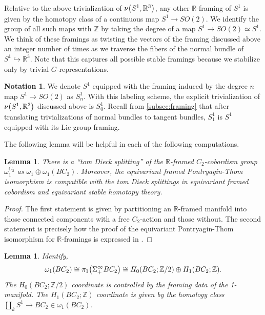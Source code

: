 \documentclass[11pt]{amsart}
\newcommand{\R}{\mathbb R}
\newcommand{\Z}{\mathbb{Z}}
\theoremstyle{plain}   %
\newtheorem{lem}[thm]{Lemma}
\theoremstyle{definition}
\newtheorem{notn}[thm]{Notation}
\theoremstyle{remark}
\numberwithin{equation}{section}
\let\originalleft\left
\let\originalright\right
\renewcommand{\left}{\mathopen{}\mathclose\bgroup\originalleft}
\renewcommand{\right}{\aftergroup\egroup\originalright}
\begin{document}
Relative to the above trivialization of $\nu\left(S^1,\R^3\right)$, any other $\R$-framing of $S^1$ is given by the homotopy class of a continuous map $S^1\to SO(2)$. We identify the group of all such maps with $\Z$ by taking the degree of a map $S^1\to SO(2)\simeq S^1$. We think of these framings as twisting the vectors of the framing discussed above an integer number of times as we traverse the fibers of the normal bundle of $S^1\hookrightarrow \R^3$. Note that this captures all possible stable framings because we stabilize only by trivial $G$-representations.

\begin{notn}
We denote $S^1$ equipped with the framing induced by the degree $n$ map $S^1\to SO(2)$ as $S^1_n$. With this labeling scheme, the explicit trivialization of $\nu\left(S^1,\R^3\right)$ discussed above is $S^1_0$. Recall from \cref{subsec:framing} that after translating trivializations of normal bundles to tangent bundles, $S^1_1$ is $S^1$ equipped with its Lie group framing. 
\end{notn} 

The following lemma will be helpful in each of the following computations.

\begin{lem}\label{lem:cobordism tom Dieck}
There is a ``tom Dieck splitting'' of the $\R$-framed $C_2$-cobordism group $\omega_1^{C_2}$ as $\omega_1\oplus \omega_1(BC_2)$. Moreover, the equivariant framed Pontryagin-Thom isomorphism is compatible with the tom Dieck splittings in equivariant framed cobordism and equivariant stable homotopy theory.
\end{lem}

\begin{proof}
The first statement is given by partitioning an $\R$-framed manifold into those connected components with a free $C_2$-action and those without. The second statement is precisely how the proof of the equivariant Pontryagin-Thom isomorphism for $\R$-framings is expressed in \cite{williams_cobordism}. 
\end{proof}

\begin{lem}\label{lem:split}
Identify,
\[
\omega_1\left(BC_2\right)\cong \pi_1\left(\Sigma_+^\infty BC_2\right)\cong H_0\left(BC_2;\Z/2\right)\oplus H_1\left(BC_2;\Z\right).
\]
The $H_0(BC_2;\Z/2)$ coordinate is controlled by the framing data of the 1-manifold. The $H_1(BC_2;\Z)$ coordinate is given by the homology class $\amalg_k S^1 \to BC_2\in \omega_1(BC_2)$. 
\end{lem}
\end{document}

